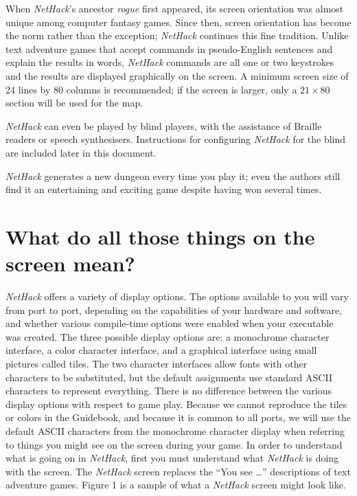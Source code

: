 When {\it NetHack\/}'s ancestor {\it rogue\/} first appeared, its screen
orientation was almost unique among computer fantasy games.  Since
then, screen orientation has become the norm rather than the
exception; {\it NetHack\/} continues this fine tradition.  Unlike text
adventure games that accept commands in pseudo-English sentences and
explain the results in words, {\it NetHack\/} commands are all one or two
keystrokes and the results are displayed graphically on the screen.  A
minimum screen size of 24 lines by 80 columns is recommended; if the
screen is larger, only a $21\times80$ section will be used for the map.

{\it NetHack\/} can even be played by blind players, with the assistance of
Braille readers or speech synthesisers.  Instructions for configuring
{\it NetHack\/} for the blind are included later in this document.

{\it NetHack\/} generates a new dungeon every time you play it; even the
authors still find it an entertaining and exciting game despite
having won several times.

\section{What do all those things on the screen mean?}
{\it NetHack\/} offers a variety of display options.  The options available to
you will vary from port to port, depending on the capabilities of your
hardware and software, and whether various compile-time options were
enabled when your executable was created.  The three possible display
options are: a monochrome character interface, a color character interface,
and a graphical interface using small pictures called tiles.  The two
character interfaces allow fonts with other characters to be substituted,
but the default assignments use standard ASCII characters to represent
everything.  There is no difference between the various display options
with respect to game play.  Because we cannot reproduce the tiles or
colors in the Guidebook, and because it is common to all ports, we will
use the default ASCII characters from the monochrome character display
when referring to things you might see on the screen during your game.
In order to understand what is going on in {\it NetHack}, first you must
understand what {\it NetHack\/} is doing with the screen.  The {\it NetHack\/}
screen replaces the ``You see \ldots'' descriptions of text adventure games.
Figure 1 is a sample of what a {\it NetHack\/} screen might look like.

